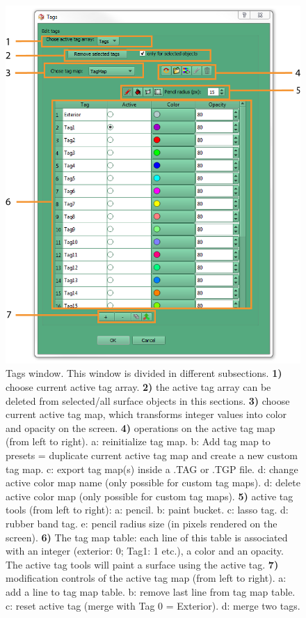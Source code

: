 \begin{figure}
  \centering
  \includegraphics[scale=1]{images/12/tags_window2.png}
\caption{Tags window. This window is divided in different subsections. \textbf{1)} choose current active tag array.  \textbf{2)} the active tag array can be deleted from selected/all surface objects in this sections. \textbf{3)} choose current active tag map, which transforms integer values into color and opacity on the screen. \textbf{4)} operations on the active tag map (from left to right). a: reinitialize tag map. b: Add tag map to presets = duplicate current active tag map and create a new custom tag map. c: export tag map(s) inside a .TAG or .TGP file. d: change active color map name (only possible for custom tag maps). d: delete active color map (only possible for custom tag maps). \textbf{5)} active tag tools (from left to right): a: pencil. b: paint bucket. c: lasso tag. d: rubber band tag. e: pencil radius size (in pixels rendered on the screen).  \textbf{6)} The tag map table: each line of this table is associated with an integer (exterior: 0; Tag1: 1 etc.), a color and an opacity. The active tag tools will paint a surface using the active tag. \textbf{7)} modification controls of the active tag map (from left to right). a: add a line to tag map table. b: remove last line from tag map table. c: reset active tag (merge with Tag 0 = Exterior). d: merge two tags.}	
\label{tags_window}
 \end{figure}


